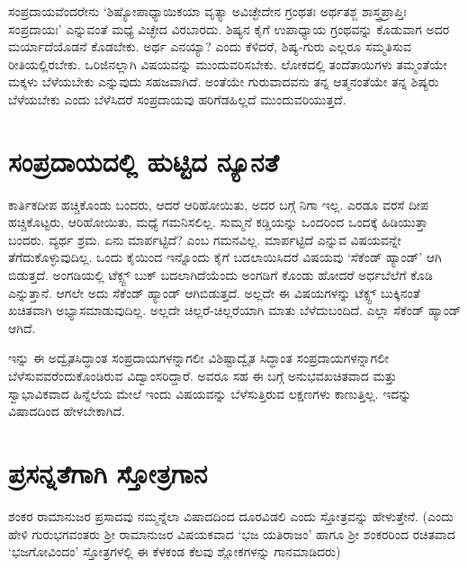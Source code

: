 ಸಂಪ್ರದಾಯವೆಂದರೇನು `ಶಿಷ್ಯೋಪಾಧ್ಯಾಯಿಕಯಾ ವೃತ್ಯಾ \label{45a} ಅವಿಚ್ಛೇದೇನ ಗ್ರಂಥತಃ ಅರ್ಥತಶ್ಜ ಶಾಸ್ತ್ರಪ್ರಾಪ್ತಿಃ ಸಂಪ್ರದಾಯಃ' ಎನ್ನುವಂತೆ ಮಧ್ಯೆ ವಿಚ್ಛೇದ ವಿರಬಾರದು. ಶಿಷ್ಯನ ಕೈಗೆ ಉಪಾಧ್ಯಾಯ ಗ್ರಂಥವನ್ನು ಕೊಡುವಾಗ ಅದರ ಮರ್ಯಾದೆಯೊಡನೆ ಕೊಡಬೇಕು. ಅರ್ಥ ಎನಯ್ಯಾ? ಎಂದು ಕೆಳಿದರೆ, ಶಿಷ್ಯ-ಗುರು ಎಲ್ಲರೂ ಸಮ್ಮತಿಸುವ ರೀತಿಯಲ್ಲಿರಬೇಕು. ಒರಿಜಿನಲ್ಲಾಗಿ ವಿಷಯವನ್ನು ಮುಂದುವರಿಸಬೇಕು. ಲೋಕದಲ್ಲಿ ತಂದೆತಾಯಿಗಳು ತಮ್ಮಂತೆಯೇ ಮಕ್ಕಳು ಬೆಳೆಯಬೇಕು ಎನ್ನುವುದು ಸಹಜವಾಗಿದೆ. ಅಂತೆಯೇ ಗುರುವಾದವನು ತನ್ನ ಆತ್ಮನಂತೆಯೇ ತನ್ನ ಶಿಷ್ಯರು ಬೆಳೆಯಬೇಕು ಎಂದು ಬೆಳೆಸಿದರೆ ಸಂಪ್ರದಾಯವು ಹರಿಗೆಡಹಿಲ್ಲದೆ ಮುಂದುವರಿಯುತ್ತದೆ. 

\section*{ಸಂಪ್ರದಾಯದಲ್ಲಿ ಹುಟ್ಟಿದ ನ್ಯೂನತೆ}

ಕಾರ್ತಿಕದೀಪ ಹಚ್ಚಿಕೊಂಡು ಬಂದರು, ಆದರೆ ಆರಿಹೋಯಿತು, ಅದರ ಬಗ್ಗೆ ನಿಗಾ ಇಲ್ಲ. ಎರಡೂ ವರಸೆ ದೀಪ ಹಚ್ಚಿಕೊಟ್ಟರು, ಆರಿಹೋಯಿತು, ಮಧ್ಯೆ ಗಮನಿಸಲಿಲ್ಲ. ಸುಮ್ಮನೆ ಕಡ್ಡಿಯನ್ನು ಒಂದರಿಂದ ಒಂದಕ್ಕೆ ಹಿಡಿಯುತ್ತಾ ಬಂದರು. ವ್ಯರ್ಥ ಶ್ರಮ. ಏನು ಮಾರ್ಪಟ್ಟಿದೆ? ಎಂಬ ಗಮನವಿಲ್ಲ. ಮಾರ್ಪಟ್ಟಿದೆ ಎನ್ನುವ ವಿಷಯವನ್ನೇ ತೆಗೆದುಕೊಳ್ಳುವುದಿಲ್ಲ. ಒಂದು ಕೈಯಿಂದ ಇನ್ನೊಂದು ಕೈಗೆ ಬದಲಾಯಿಸಿದರೆ ವಿಷಯವು `ಸೆಕೆಂಡ್ ಹ್ಯಾಂಡ್' ಆಗಿ ಬಿಡುತ್ತದೆ. ಅಂಗಡಿಯಲ್ಲಿ ಟೆಕ್ಸ್ಟ್  ಬುಕ್ ಬದಲಾಗಿದೆಯೆಂದು ಅಂಗಡಿಗೆ ಕೊಂಡು ಹೋದರೆ ಅರ್ಧಬೆಲೆಗೆ ಕೊಡಿ ಎನ್ನುತ್ತಾನೆ. ಆಗಲೇ ಅದು ಸೆಕೆಂಡ್ ಹ್ಯಾಂಡ್ ಆಗಿಬಿಡುತ್ತದೆ. ಅಲ್ಲದೇ ಈ ವಿಷಯಗಳನ್ನು ಟೆಕ್ಸ್ಟ್ ಬುಕ್ಕಿನಂತೆ ಖಚಿತವಾಗಿ ಅಭ್ಯಾಸಮಾಡುವುದಿಲ್ಲ. ಅಲ್ಲದೇ ಚಿಲ್ಲರೆ-ಚಿಲ್ಲರೆಯಾಗಿ ಮಾತು ಬೆಳೆದುಬಂದಿದೆ. ಎಲ್ಲಾ ಸೆಕೆಂಡ್ ಹ್ಯಾಂಡ್ ಆಗಿದೆ.

ಇನ್ನು ಈ ಅದ್ವೈತಸಿದ್ಧಾಂತ ಸಂಪ್ರದಾಯಗಳನ್ನಾಗಲೀ ವಿಶಿಷ್ಟಾದ್ವೈತ ಸಿದ್ಧಾಂತ ಸಂಪ್ರದಾಯಗಳನ್ನಾಗಲೀ ಬೆಳೆಸುವವರೆಂದುಕೊಂಡಿರುವ ವಿದ್ವಾಂಸರಿದ್ದಾರೆ. ಅವರೂ ಸಹ ಈ ಬಗ್ಗೆ ಅನುಭವಖಚಿತವಾದ ಮತ್ತು ಸ್ವಾಭಾವಿಕವಾದ ಹಿನ್ನೆಲೆಯ ಮೇಲೆ ಇಂದು ವಿಷಯವನ್ನು ಬೆಳೆಸುತ್ತಿರುವ ಲಕ್ಷಣಗಳು ಕಾಣುತ್ತಿಲ್ಲ. ಇದನ್ನು ವಿಷಾದದಿಂದ ಹೇಳಬೇಕಾಗಿದೆ.

\section*{ಪ್ರಸನ್ನತೆಗಾಗಿ ಸ್ತೋತ್ರಗಾನ}

ಶಂಕರ ರಾಮಾನುಜರ ಪ್ರಸಾದವು ನಮ್ಮನ್ನೆಲಾ ವಿಷಾದದಿಂದ ದೂರವಿಡಲಿ ಎಂದು ಸ್ತೋತ್ರವನ್ನು ಹೇಳುತ್ತೇನೆ. (ಎಂದು ಹೇಳಿ ಗುರುಭಗವಂತರು ಶ್ರೀ ರಾಮಾನುಜರ ವಿಷಯಕವಾದ `ಭಜ ಯತಿರಾಜಂ' ಹಾಗೂ ಶ್ರೀ ಶಂಕರರಿಂದ ರಚಿತವಾದ `ಭಜಗೋವಿಂದಂ' ಸ್ತೋತ್ರಗಳಲ್ಲಿ ಈ ಕೆಳಕಂಡ ಕೆಲವು ಶ್ಲೋಕಗಳನ್ನು ಗಾನಮಾಡಿದರು)


